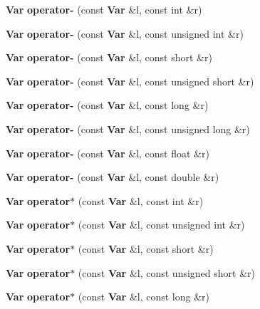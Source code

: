 \begin{CompactItemize}
\item 
{\bf Var} \textbf{operator-} (const {\bf Var} \&l, const int \&r)\label{classVar_014316817c3584b2c8e20cf49c3562d3}

\item 
{\bf Var} \textbf{operator-} (const {\bf Var} \&l, const unsigned int \&r)\label{classVar_dc359028d42f822b95554d880474e079}

\item 
{\bf Var} \textbf{operator-} (const {\bf Var} \&l, const short \&r)\label{classVar_cbf8cb6876af47be7857804b0c748a0c}

\item 
{\bf Var} \textbf{operator-} (const {\bf Var} \&l, const unsigned short \&r)\label{classVar_17a72bb79f6fc6dc27c72bb08f6c806f}

\item 
{\bf Var} \textbf{operator-} (const {\bf Var} \&l, const long \&r)\label{classVar_8f53055bdb54db533c03a8a7139da6ce}

\item 
{\bf Var} \textbf{operator-} (const {\bf Var} \&l, const unsigned long \&r)\label{classVar_8c4a0a31d2513724b615f2a67c445e9f}

\item 
{\bf Var} \textbf{operator-} (const {\bf Var} \&l, const float \&r)\label{classVar_473cf3d5907e3245a797ecd354f6efe4}

\item 
{\bf Var} \textbf{operator-} (const {\bf Var} \&l, const double \&r)\label{classVar_28a679935c4b01783a4603034401d121}

\item 
{\bf Var} \textbf{operator$\ast$} (const {\bf Var} \&l, const int \&r)\label{classVar_1f2f8765fcc1f9fcc979b64f03cdcb0f}

\item 
{\bf Var} \textbf{operator$\ast$} (const {\bf Var} \&l, const unsigned int \&r)\label{classVar_6a33b07248dcfe35f6b88fa2b163da72}

\item 
{\bf Var} \textbf{operator$\ast$} (const {\bf Var} \&l, const short \&r)\label{classVar_5172e71ee7876218112934f63470327a}

\item 
{\bf Var} \textbf{operator$\ast$} (const {\bf Var} \&l, const unsigned short \&r)\label{classVar_8c5360db352dd859748233765ed081a3}

\item 
{\bf Var} \textbf{operator$\ast$} (const {\bf Var} \&l, const long \&r)\label{classVar_fe9be5f677aff3819112e4faf3a8aed5}


\end{CompactItemize}
